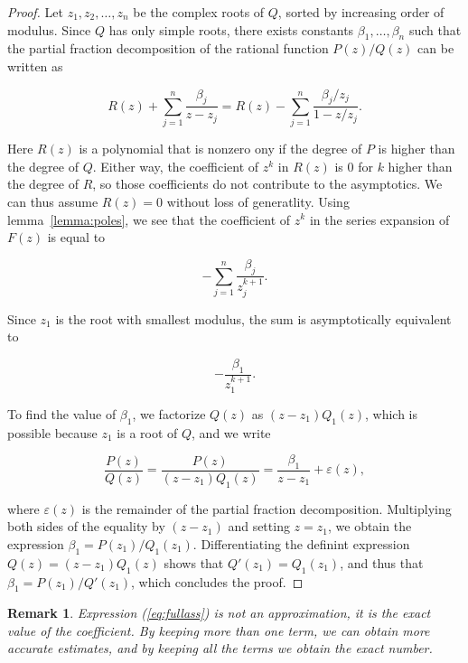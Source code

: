 \documentclass{article}
\newtheorem{remark}{Remark}
\begin{document}
\begin{proof}
Let $z_1, z_2, \ldots, z_n$ be the complex roots of $Q$, sorted by
increasing order of modulus. Since $Q$ has only simple roots, there exists
constants $\beta_1, \ldots, \beta_n$ such that the partial fraction
decomposition of the rational function $P(z)/Q(z)$ can be written as

\begin{equation}
R(z) + \sum_{j=1}^n \frac{\beta_j}{z-z_j} =
R(z) -\sum_{j=1}^n \frac{\beta_j/z_j}{1-z/z_j}.
\end{equation}

Here $R(z)$ is a polynomial that is nonzero ony if the degree of $P$ is
higher than the degree of $Q$. Either way, the coefficient of $z^k$ in
$R(z)$ is $0$ for $k$ higher than the degree of $R$, so those coefficients
do not contribute to the asymptotics. We can thus assume $R(z) = 0$
without loss of generatlity. Using lemma~\ref{lemma:poles}, we see that
the coefficient of $z^k$ in the series expansion of $F(z)$ is equal to

\begin{equation}
\label{eq:fullass}
-\sum_{j=1}^n \frac{\beta_j}{z_j^{k+1}}.
\end{equation}

Since $z_1$ is the root with smallest modulus, the sum is asymptotically
equivalent to

\begin{equation*}
-\frac{\beta_1}{z_1^{k+1}}.
\end{equation*}

To find the value of $\beta_1$, we factorize $Q(z)$ as
$(z-z_1)Q_1(z)$, which is possible because $z_1$ is a root of $Q$,
and we write

\begin{equation*}
\frac{P(z)}{Q(z)} =
\frac{P(z)}{(z-z_1)Q_1(z)} = \frac{\beta_1}{z-z_1} +
\varepsilon(z),
\end{equation*}

\noindent
where $\varepsilon(z)$ is the remainder of the partial fraction
decomposition. Multiplying both sides of the equality by $(z-z_1)$ and
setting $z = z_1$, we obtain the expression $\beta_1 = P(z_1) / Q_1(z_1)$.
Differentiating the definint expression $Q(z) = (z-z_1)Q_1(z)$ shows that
$Q'(z_1) = Q_1(z_1)$, and thus that $\beta_1 = P(z_1) / Q'(z_1)$, which
concludes the proof.
\end{proof}

\begin{remark}
Expression (\ref{eq:fullass}) is not an approximation, it is the exact
value of the coefficient. By keeping more than one term, we can obtain
more accurate estimates, and by keeping all the terms we obtain the exact
number.
\end{remark}
\end{document}
